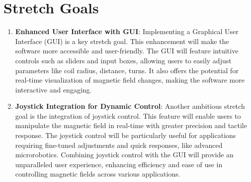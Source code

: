 \documentclass{article}
\begin{document}
\section{Stretch Goals}

\begin{enumerate}
    \item \textbf{Enhanced User Interface with GUI}: Implementing a Graphical User Interface (GUI) is a key stretch goal. This enhancement will make the software more accessible and user-friendly. The GUI will feature intuitive controls such as sliders and input boxes, allowing users to easily adjust parameters like coil radius, distance, turns. It also offers the potential for real-time visualization of magnetic field changes, making the software more interactive and engaging.
    \item \textbf{Joystick Integration for Dynamic Control}: Another ambitious stretch goal is the integration of joystick control. This feature will enable users to manipulate the magnetic field in real-time with greater precision and tactile response. The joystick control will be particularly useful for applications requiring fine-tuned adjustments and quick responses, like advanced microrobotics. Combining joystick control with the GUI will provide an unparalleled user experience, enhancing efficiency and ease of use in controlling magnetic fields across various applications.
\end{enumerate}
\end{document}
